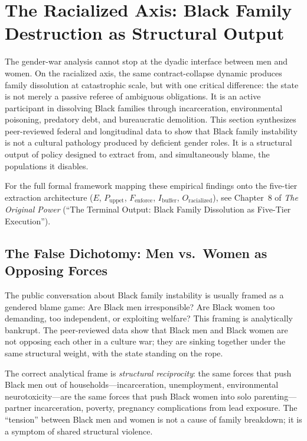 \section{The Racialized Axis: Black Family Destruction as Structural Output}
\label{sec:black_family}

The gender-war analysis cannot stop at the dyadic interface between men and women. On the racialized axis, the same contract-collapse dynamic produces family dissolution at catastrophic scale, but with one critical difference: the state is not merely a passive referee of ambiguous obligations. It is an active participant in dissolving Black families through incarceration, environmental poisoning, predatory debt, and bureaucratic demolition. This section synthesizes peer-reviewed federal and longitudinal data to show that Black family instability is not a cultural pathology produced by deficient gender roles. It is a structural output of policy designed to extract from, and simultaneously blame, the populations it disables.

For the full formal framework mapping these empirical findings onto the five-tier extraction architecture ($E$, $P_{\text{uppet}}$, $F_{\text{enforce}}$, $I_{\text{buffer}}$, $O_{\text{racialized}}$), see Chapter~8 of \textit{The Original Power} (``The Terminal Output: Black Family Dissolution as Five-Tier Execution'').

\subsection{The False Dichotomy: Men vs.\ Women as Opposing Forces}

The public conversation about Black family instability is usually framed as a gendered blame game: Are Black men irresponsible? Are Black women too demanding, too independent, or exploiting welfare? This framing is analytically bankrupt. The peer-reviewed data show that Black men and Black women are not opposing each other in a culture war; they are sinking together under the same structural weight, with the state standing on the rope.

The correct analytical frame is \textit{structural reciprocity}: the same forces that push Black men out of households---incarceration, unemployment, environmental neurotoxicity---are the same forces that push Black women into solo parenting---partner incarceration, poverty, pregnancy complications from lead exposure. The ``tension'' between Black men and women is not a cause of family breakdown; it is a symptom of shared structural violence.

